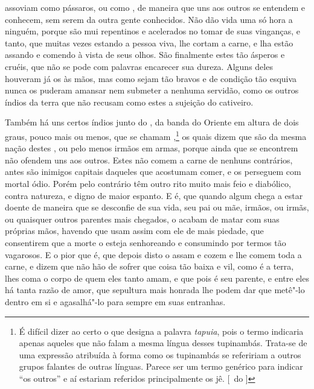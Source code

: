 assoviam como pássaros, ou como , de maneira que uns aos outros
se entendem e conhecem, sem serem da outra gente conhecidos. Não dão
vida uma só hora a ninguém, porque são mui repentinos e acelerados no
tomar de suas vinganças, e tanto, que muitas vezes estando a pessoa
viva, lhe cortam a carne, e lha estão assando e comendo à vista de seus \EP[1]
olhos. São finalmente estes  tão ásperos e cruéis, que não se
pode com palavras encarecer sua dureza. Alguns deles houveram já os			%
 às mãos, mas como sejam tão bravos e de condição tão
esquiva nunca os puderam amansar nem submeter a nenhuma servidão, como os		
outros índios da terra que não recusam como estes a sujeição do cativeiro.

Também há uns certos índios junto do , da banda do		%
Oriente em altura de dois graus, pouco mais ou menos, que se chamam
,\footnote{É difícil dizer ao certo o que designa a palavra \textit{tapuia},  
pois o termo indicaria apenas aqueles que não falam a mesma língua desses tupinambás. Trata-se de uma
expressão atribuída à forma como os tupinambás se refeririam a outros
grupos falantes de outras línguas. Parece ser um termo genérico para
indicar ``os outros'' e aí estariam referidos principalmente os jê. [~do ]}  
os quais dizem que são da mesma nação destes , ou pelo %
menos irmãos em armas, porque ainda que se encontrem não ofendem uns			%
aos outros. Estes  não comem a carne de nenhuns contrários, 
antes são inimigos capitais daqueles que acostumam comer, e os
perseguem com mortal ódio. Porém pelo contrário têm outro rito muito
mais feio e diabólico, contra natureza, e digno de maior espanto. E é,
que quando algum chega a estar doente de maneira que se desconfie de
sua vida, seu pai ou mãe, irmãos, ou irmãs, ou quaisquer outros
parentes mais chegados, o acabam de matar com suas próprias mãos,			%
havendo que usam assim com ele de mais piedade, que consentirem que a
morte o esteja senhoreando e consumindo por termos tão vagarosos. E o
pior que é, que depois disto o assam e cozem e lhe comem toda a carne,
e dizem que não hão de sofrer que coisa tão baixa e vil, como é a
terra, lhes coma o corpo de quem eles tanto amam, e que pois é seu
parente, e entre eles há tanta razão de amor, que sepultura mais
honrada lhe podem dar que metê"-lo dentro em si e agasalhá"-lo para			%
sempre em suas entranhas.

